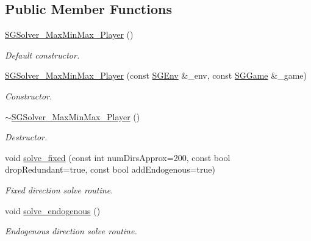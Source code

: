 \subsection*{Public Member Functions}
\begin{DoxyCompactItemize}
\item 
\mbox{\label{classSGSolver__MaxMinMax__3Player_aa6c2fea646cbadb83d21794680ba3f81}} 
\hyperlink{classSGSolver__MaxMinMax__3Player_aa6c2fea646cbadb83d21794680ba3f81}{S\+G\+Solver\+\_\+\+Max\+Min\+Max\+\_\+Player} ()
\begin{DoxyCompactList}\small\item\em Default constructor. \end{DoxyCompactList}\item 
\hyperlink{classSGSolver__MaxMinMax__3Player_a6ce2ccd99ac00de13d16518e27f8d2ec}{S\+G\+Solver\+\_\+\+Max\+Min\+Max\+\_\+Player} (const \hyperlink{classSGEnv}{S\+G\+Env} \&\+\_\+env, const \hyperlink{classSGGame}{S\+G\+Game} \&\+\_\+game)
\begin{DoxyCompactList}\small\item\em Constructor. \end{DoxyCompactList}\item 
\mbox{\label{classSGSolver__MaxMinMax__3Player_af4f9c0e70de07e664bb1aebc2789b3a3}} 
\hyperlink{classSGSolver__MaxMinMax__3Player_af4f9c0e70de07e664bb1aebc2789b3a3}{$\sim$\+S\+G\+Solver\+\_\+\+Max\+Min\+Max\+\_\+Player} ()
\begin{DoxyCompactList}\small\item\em Destructor. \end{DoxyCompactList}\item 
void \hyperlink{classSGSolver__MaxMinMax__3Player_aaf5e24f4a90e8ec1541f3cf1c1aea9e6}{solve\+\_\+fixed} (const int num\+Dirs\+Approx=200, const bool drop\+Redundant=true, const bool add\+Endogenous=true)
\begin{DoxyCompactList}\small\item\em Fixed direction solve routine. \end{DoxyCompactList}\item 
void \hyperlink{classSGSolver__MaxMinMax__3Player_a6b97fe646fe06e3ca384496e592a1b1a}{solve\+\_\+endogenous} ()
\begin{DoxyCompactList}\small\item\em Endogenous direction solve routine. \end{DoxyCompactList}\item 

\end{DoxyCompactItemize}
